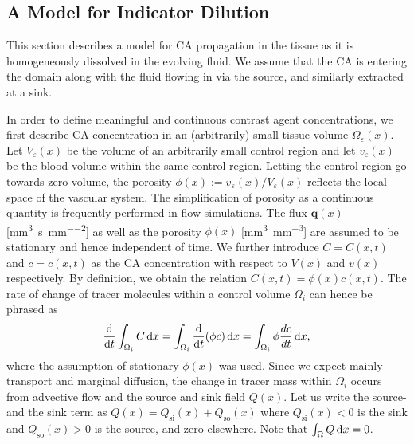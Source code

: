 \documentclass[journal,twocolumn]{IEEEtran}
\newcommand{\Qso}{Q_{\mathrm{so}}}
\newcommand{\Qsi}{Q_{\mathrm{si}}}
\newcommand{\vq}{\mathbf{q}}
\newcommand{\siq}{\milli\meter\cubed\per\second\per\milli\meter\squared}
\newcommand{\siphi}{\milli\meter\cubed\per\milli\meter\cubed}
\begin{document}
	\subsection{A Model for Indicator Dilution}\label{sec:transport}

	This section describes a model for  CA propagation in the tissue as it is homogeneously dissolved in the evolving fluid.
	We assume that the CA is entering the domain along with the fluid flowing in via the source, and similarly extracted at a sink.

	In order to define meaningful and continuous contrast agent concentrations, we first describe CA concentration in an (arbitrarily) small tissue volume $\Omega_\varepsilon(x)$.
	Let $V_\varepsilon(x)$ be the volume of an arbitrarily small control region and let $v_\varepsilon(x)$ be the blood volume within the same control region.
	Letting the control region go towards zero volume, the porosity $\phi(x) := v_\varepsilon(x)/V_\varepsilon(x)$ reflects the local space of the vascular system. The simplification of porosity as a continuous quantity is frequently performed in flow simulations.
	The flux $\vq(x)$ [\si{\siq}] as well as the porosity $\phi(x)$ [\si{\siphi}] are assumed to be stationary and hence independent of time.	
	We further introduce $C = C(x,t)$ and $c = c(x,t)$ as the CA concentration with respect to $V(x)$ and $v(x)$ respectively.
	By definition, we obtain the relation $C(x,t) = \phi(x)  c(x,t)$.
	The rate of change of tracer molecules within a control volume $\Omega_i$ can hence be phrased as
	\begin{equation}
		\diffop{t}\int_{\Omega_i}C \diffint x = \int_{\Omega_i}\diffop{t}(\phi c) \diffint x = \int_{\Omega_i} \phi \frac{d c}{dt}\diffint x,
		\label{eq:dmdt}
	\end{equation}	
	where the assumption of stationary $\phi(x)$ was used.
	Since we expect mainly transport and marginal diffusion, the change in tracer mass within $\Omega_i$ occurs from advective flow and the source and sink field $Q(x)$.
	Let us write the source- and the sink term as $Q(x) = \Qsi(x) + \Qso(x)$ where $\Qsi(x) < 0$ is the sink and $\Qso(x) > 0$ is the source, and zero elsewhere. 
	Note that $\int_\Omega Q \,\mathrm{d} x = 0$. 
\end{document}
